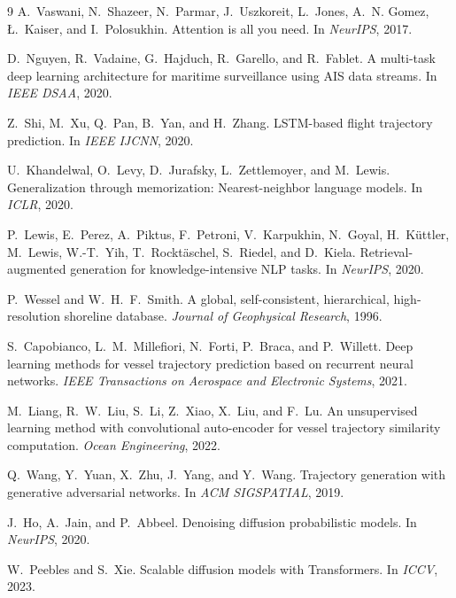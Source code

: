 \documentclass[11pt,a4paper]{article}
\begin{document}
\begin{thebibliography}{9}
A.~Vaswani, N.~Shazeer, N.~Parmar, J.~Uszkoreit, L.~Jones, A.~N. Gomez,
\L.~Kaiser, and I.~Polosukhin.
\newblock Attention is all you need.
\newblock In \emph{NeurIPS}, 2017.

D.~Nguyen, R.~Vadaine, G.~Hajduch, R.~Garello, and R.~Fablet.
\newblock A multi-task deep learning architecture for maritime
  surveillance using AIS data streams.
\newblock In \emph{IEEE DSAA}, 2020.

Z.~Shi, M.~Xu, Q.~Pan, B.~Yan, and H.~Zhang.
\newblock LSTM-based flight trajectory prediction.
\newblock In \emph{IEEE IJCNN}, 2020.

U.~Khandelwal, O.~Levy, D.~Jurafsky, L.~Zettlemoyer, and M.~Lewis.
\newblock Generalization through memorization: Nearest-neighbor
  language models.
\newblock In \emph{ICLR}, 2020.

P.~Lewis, E.~Perez, A.~Piktus, F.~Petroni, V.~Karpukhin, N.~Goyal,
H.~K\"uttler, M.~Lewis, W.-T.~Yih, T.~Rockt\"aschel, S.~Riedel, and
D.~Kiela.
\newblock Retrieval-augmented generation for knowledge-intensive NLP
  tasks.
\newblock In \emph{NeurIPS}, 2020.

P.~Wessel and W.~H.~F.~Smith.
\newblock A global, self-consistent, hierarchical, high-resolution
  shoreline database.
\newblock \emph{Journal of Geophysical Research}, 1996.

S.~Capobianco, L.~M.~Millefiori, N.~Forti, P.~Braca, and P.~Willett.
\newblock Deep learning methods for vessel trajectory prediction based
  on recurrent neural networks.
\newblock \emph{IEEE Transactions on Aerospace and Electronic Systems},
  2021.

M.~Liang, R.~W.~Liu, S.~Li, Z.~Xiao, X.~Liu, and F.~Lu.
\newblock An unsupervised learning method with convolutional
  auto-encoder for vessel trajectory similarity computation.
\newblock \emph{Ocean Engineering}, 2022.

Q.~Wang, Y.~Yuan, X.~Zhu, J.~Yang, and Y.~Wang.
\newblock Trajectory generation with generative adversarial networks.
\newblock In \emph{ACM SIGSPATIAL}, 2019.

J.~Ho, A.~Jain, and P.~Abbeel.
\newblock Denoising diffusion probabilistic models.
\newblock In \emph{NeurIPS}, 2020.

W.~Peebles and S.~Xie.
\newblock Scalable diffusion models with Transformers.
\newblock In \emph{ICCV}, 2023.
\end{thebibliography}
\end{document}
